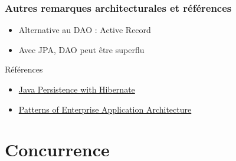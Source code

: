 \documentclass[english, french]{beamer}
\begin{document}
\begin{frame}
	\frametitle{Autres remarques architecturales et références}
	\begin{itemize}
		\item Alternative au DAO : Active Record
		\item Avec JPA, DAO peut être superflu
	\end{itemize}
	\begin{block}{Références}
		\begin{itemize}
			\item \href{http://gen.lib.rus.ec/book/index.php?md5=5D9F8BC8761804C0EBB8FE6A60BCF817}{Java Persistence with Hibernate}
			\item \href{http://gen.lib.rus.ec/book/index.php?md5=37E9F4F25E3C5609E14415472408B80C}{Patterns of Enterprise Application Architecture}
		\end{itemize}
	\end{block}
\end{frame}

\newlength{\JEEIsolVert}
\newlength{\JEEIsolBefTr}
\newlength{\JEEIsolOuter}
\setlength{\JEEIsolVert}{3mm}
\setlength{\JEEIsolBefTr}{1.2cm}
\setlength{\JEEIsolOuter}{3mm}

\section{Concurrence}
\end{document}
